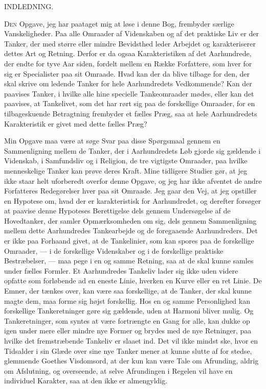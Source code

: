 \documentclass[12pt,a4paper,openany]{book}
\newcommand{\opage}[1]{\marginnote{\footnotesize\textit{[#1]}}}
\newcommand{\unnumhead}[1]{\par\bigskip\phantomsection\begin{center}{\Large #1}\end{center}\addcontentsline{toc}{chapter}{#1}\medskip}
\begin{document}
\mainmatter

\opage{1}

\unnumhead{INDLEDNING.}

D\textsc{en} Opgave, jeg har paataget mig at løse i denne Bog, frembyder
særlige Vanskeligheder. Paa alle Omraader af Videnskaben og af det praktiske Liv er der Tanker, der med større eller mindre
Bevidsthed leder Arbejdet og karakteriserer dettes Art og Retning.
Derfor er da ogsaa Karakteristiken af det Aarhundrede, der
endte for tyve Aar siden, fordelt mellem en Række Forfattere, som
hver for sig er Specialister paa sit Omraade. Hvad kan der da blive
tilbage for den, der skal skrive om ledende Tanker for hele Aarhundredets
Vedkommende? Kan der paavises Tanker, i hvilke alle
hine specielle Tankeomraader mødes, eller kan det paavises, at
Tankelivet, som det har rørt sig paa de forskellige Omraader, for
en tilbageskuende Betragtning frembyder et fælles Præg, saa at hele
Aarhundredets Karakteristik er givet med dette fælles Præg?

Min Opgave maa være at søge Svar paa disse Spørgsmaal gennem
en Sammenligning mellem de Tanker, der i Aarhundredets Løb
gjorde sig gældende i Videnskab, i Samfundsliv og i Religion, de tre
vigtigste Omraader, paa hvilke menneskelige Tanker kan prøve deres
Kraft. Mine tidligere Studier gør, at jeg ikke staar helt uforberedt
overfor denne Opgave, og jeg har ikke afventet de andre Forfatteres
Redegørelser hver paa sit Omraade. Jeg gaar den Vej, at jeg opstiller
en Hypotese om, hvad der er karakteristisk for Aarhundredet, og
derefter forsøger at paavise denne Hypoteses Berettigelse dels gennem
Undersøgelse af de Hovedtanker, der samler Opmærksomheden
om sig, dels gennem Sammenligning mellem dette Aarhundredes Tankearbejde
og de foregaaende Aarhundreders. Det er ikke paa Forhaand
givet, at de Tankelinier, som kan spores paa de forskellige Omraader,
--- i de forskellige Videnskaber og i de forskellige praktiske
Bestræbelser, --- maa pege i en og samme Retning, saa at de skal
\opage{2}kunne samles under fælles Formler. Et Aarhundredes Tankeliv lader
sig ikke uden videre opfatte som forløbende ad en eneste Linie,
hverken en Kurve eller en ret Linie. De Emner, der tænkes over, kan
være saa forskellige, at de Tanker, der skal kunne magte dem, maa
forme sig højst forskellig. Hos en og samme Personlighed kan forskellige
Tankeretninger gøre sig gældende, uden at Harmoni bliver
mulig. Og Tankeretninger, som syntes at være fortrængte en Gang
for alle, kan dukke op igen under mere eller mindre nye Former og
brydes med de nye Retninger, paa hvilke det fremstræbende Tankeliv
er slaaet ind. Det vil ikke mindst ske, hvor en Tidsalder i sin
Glæde over sine nye Tanker mener at kunne slutte af for stedse,
glemmende Goethes Visdomsord, at der kun kan være Tale om Afrunding,
aldrig om Afslutning, og overseende, at selve Afrundingen
i Regelen vil have en individuel Karakter, saa at den ikke er almengyldig.
\end{document}
